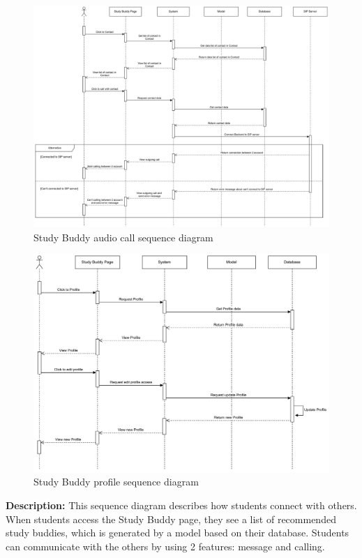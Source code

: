     \begin{figure}[H]
        \centering
        \includegraphics[width=1\textwidth]{image/StudyBuddySequenceDiagram-Contact.pdf} 
        \caption{Study Buddy audio call sequence diagram}
        \label{fig:studyBuddy_audiocall_sequence}
    \end{figure}

    \begin{figure}[H]
        \centering
        \includegraphics[width=1\textwidth]{image/StudyBuddySequenceDiagram-Profile.pdf} 
        \caption{Study Buddy profile sequence diagram}
        \label{fig:studyBuddy_profile_sequence}
    \end{figure}

    \textbf{Description:} This sequence diagram describes how students connect with others. 
    When students access the Study Buddy page, they see a list of recommended study buddies, which is generated by a model based on their database. 
    Students can communicate with the others by using 2 features: message and calling. \\


